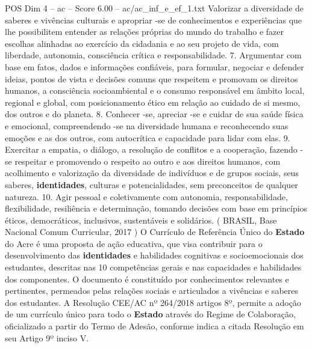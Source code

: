\begin{textsample}{POS Dim 4 – ac – Score 6.00 – ac/ac\_inf\_e\_ef\_1.txt}
Valorizar a diversidade de saberes e vivências culturais e apropriar -se de conhecimentos e experiências que lhe possibilitem entender as relações próprias do mundo do trabalho e fazer escolhas alinhadas ao exercício da cidadania e ao seu projeto de vida, com liberdade, autonomia, consciência crítica e responsabilidade. 7.
Argumentar com base em fatos, dados e informações confiáveis, para formular, negociar e defender ideias, pontos de vista e decisões comuns que respeitem e promovam os direitos humanos, a consciência socioambiental e o consumo responsável em âmbito local, regional e global, com posicionamento ético em relação ao cuidado de si mesmo, dos outros e do planeta. 8.
Conhecer -se, apreciar -se e cuidar de sua saúde física e emocional, compreendendo -se na diversidade humana e reconhecendo suas emoções e as dos outros, com autocrítica e capacidade para lidar com elas. 9.
Exercitar a empatia, o diálogo, a resolução de conflitos e a cooperação, fazendo -se respeitar e promovendo o respeito ao outro e aos direitos humanos, com acolhimento e valorização da diversidade de indivíduos e de grupos sociais, seus saberes, \textbf{identidades}, culturas e potencialidades, sem preconceitos de qualquer natureza. 10.
Agir pessoal e coletivamente com autonomia, responsabilidade, flexibilidade, resiliência e determinação, tomando decisões com base em princípios éticos, democráticos, inclusivos, sustentáveis e solidários. ( BRASIL, Base Nacional Comum Curricular, 2017 ) O Currículo de Referência Único do \textbf{Estado} do Acre é uma proposta de ação educativa, que visa contribuir para o desenvolvimento das \textbf{identidades} e habilidades cognitivas e socioemocionais dos estudantes, descritas nas 10 competências gerais e nas capacidades e habilidades dos componentes.
O documento é constituído por conhecimentos relevantes e pertinentes, permeados pelas relações sociais e articulados a vivências e saberes dos estudantes.
A Resolução CEE/AC nº 264/2018 artigos 8º, permite a adoção de um currículo único para todo o \textbf{Estado} através do Regime de Colaboração, oficializado a partir do Termo de Adesão, conforme indica a citada Resolução em seu Artigo 9º inciso V.

\end{textsample}
